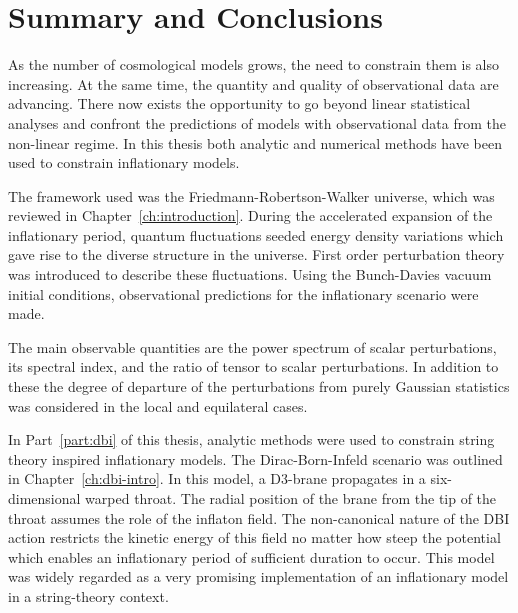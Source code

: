\renewcommand{\CVSrevision}%
{\version$Id: theend.tex,v 1.11 2009/11/10 12:02:30 ith Exp $}

\chapter{Summary and Conclusions}
\label{ch:conclusions}

As the number of cosmological models grows, the need to constrain them is also
increasing. At the same time, the quantity and quality of observational data are
advancing. There now exists the opportunity to go beyond linear statistical analyses
and confront the predictions of models with observational data from the non-linear
regime. In this thesis both analytic and numerical methods have been used to
constrain inflationary models.

The framework used was the Friedmann-Robertson-Walker universe, which was reviewed
in Chapter~\ref{ch:introduction}. During the accelerated expansion of the
inflationary period, quantum fluctuations seeded energy density variations which
gave rise to the diverse structure in the universe. First order perturbation theory
was introduced to describe these fluctuations. Using the Bunch-Davies vacuum initial
conditions, observational predictions for the inflationary scenario were made.

The main observable quantities are the power spectrum of scalar perturbations, its
spectral index, and the ratio of tensor to scalar perturbations. In addition to
these the degree of departure of the perturbations from purely Gaussian statistics
was considered in the local and equilateral cases.



In Part~\ref{part:dbi} of this thesis, analytic methods were used to constrain
string theory inspired inflationary models. The Dirac-Born-Infeld scenario was
outlined in Chapter~\ref{ch:dbi-intro}. In this model, a D3-brane propagates in a
six-dimensional warped throat. The radial position of the brane from the tip of the
throat assumes the role of the inflaton field. The non-canonical nature of the DBI
action restricts the kinetic energy of this field no matter how steep the potential
which enables an inflationary period of sufficient duration to occur.
This model was widely regarded as a very promising implementation of an inflationary
model in a string-theory context.

